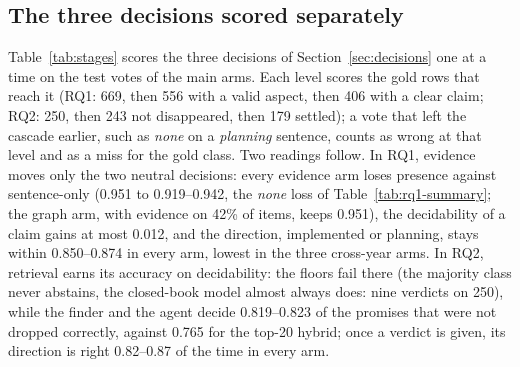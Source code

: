 \documentclass[11pt]{article}
\begin{document}
\FloatBarrier

\subsection{The three decisions scored separately}
\label{app:stages}
Table~\ref{tab:stages} scores the three decisions of Section~\ref{sec:decisions} one at a time on the test votes of the main arms. Each level scores the gold rows that reach it (RQ1: 669, then 556 with a valid aspect, then 406 with a clear claim; RQ2: 250, then 243 not disappeared, then 179 settled); a vote that left the cascade earlier, such as \emph{none} on a \emph{planning} sentence, counts as wrong at that level and as a miss for the gold class. Two readings follow. In RQ1, evidence moves only the two neutral decisions: every evidence arm loses presence against sentence-only (0.951 to 0.919--0.942, the \emph{none} loss of Table~\ref{tab:rq1-summary}; the graph arm, with evidence on 42\% of items, keeps 0.951), the decidability of a claim gains at most 0.012, and the direction, implemented or planning, stays within 0.850--0.874 in every arm, lowest in the three cross-year arms. In RQ2, retrieval earns its accuracy on decidability: the floors fail there (the majority class never abstains, the closed-book model almost always does: nine verdicts on 250), while the finder and the agent decide 0.819--0.823 of the promises that were not dropped correctly, against 0.765 for the top-20 hybrid; once a verdict is given, its direction is right 0.82--0.87 of the time in every arm.
\end{document}
